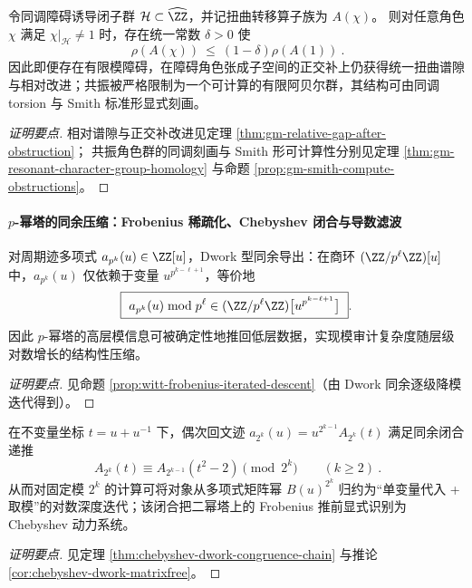 \begin{conclusion}\label{con:xi-relative-gap-after-obstruction-finite-resonant-subspace}
令同调障碍诱导闭子群 \(\mathcal{H}\subset\widehat{\ZZ}\)，并记扭曲转移算子族为 \(A(\chi)\)。
则对任意角色 \(\chi\) 满足 \(\chi|_{\mathcal{H}}\neq 1\) 时，存在统一常数 \(\delta>0\) 使
\[
\boxed{\ \rho(A(\chi))\ \le\ (1-\delta)\rho(A(1))\ }.
\]
因此即便存在有限模障碍，在障碍角色张成子空间的正交补上仍获得统一扭曲谱隙与相对改进；共振被严格限制为一个可计算的有限阿贝尔群，其结构可由同调 torsion 与 Smith 标准形显式刻画。
\end{conclusion}
\begin{proof}[证明要点]
相对谱隙与正交补改进见定理 \ref{thm:gm-relative-gap-after-obstruction}；
共振角色群的同调刻画与 Smith 形可计算性分别见定理 \ref{thm:gm-resonant-character-group-homology} 与命题 \ref{prop:gm-smith-compute-obstructions}。
\end{proof}

\paragraph{\texorpdfstring{$p$}{p}-幂塔的同余压缩：Frobenius 稀疏化、Chebyshev 闭合与导数滤波}

\begin{conclusion}\label{con:xi-witt-frobenius-sparsification-universal}
对周期迹多项式 \(a_{p^k}(u)\in\ZZ[u]\)，Dwork 型同余导出：在商环 \((\ZZ/p^\ell\ZZ)[u]\) 中，\(a_{p^k}(u)\) 仅依赖于变量 \(u^{p^{k-\ell+1}}\)，等价地
\[
\boxed{\ a_{p^k}(u)\bmod p^\ell\in(\ZZ/p^\ell\ZZ)\bigl[u^{p^{k-\ell+1}}\bigr]\ }.
\]
因此 \(p\)-幂塔的高层模信息可被确定性地推回低层数据，实现模审计复杂度随层级对数增长的结构性压缩。
\end{conclusion}
\begin{proof}[证明要点]
见命题 \ref{prop:witt-frobenius-iterated-descent}（由 Dwork 同余逐级降模迭代得到）。
\end{proof}

\begin{conclusion}[\texorpdfstring{$p=2$}{p=2} 的 Chebyshev--Dwork 闭合：矩阵幂同余递推降维为单变量代入 \texorpdfstring{$t\mapsto t^2-2$}{t->t^2-2}]\label{con:xi-chebyshev-dwork-closure-p2}
在不变量坐标 \(t=u+u^{-1}\) 下，偶次回文迹 \(a_{2^k}(u)=u^{2^{k-1}}A_{2^k}(t)\) 满足同余闭合递推
\[
\boxed{\ A_{2^k}(t)\equiv A_{2^{k-1}}(t^2-2)\pmod{2^k}\qquad(k\ge 2)\ }.
\]
从而对固定模 \(2^k\) 的计算可将对象从多项式矩阵幂 \(B(u)^{2^k}\) 归约为“单变量代入 + 取模”的对数深度迭代；该闭合把二幂塔上的 Frobenius 推前显式识别为 Chebyshev 动力系统。
\end{conclusion}
\begin{proof}[证明要点]
见定理 \ref{thm:chebyshev-dwork-congruence-chain} 与推论 \ref{cor:chebyshev-dwork-matrixfree}。
\end{proof}

